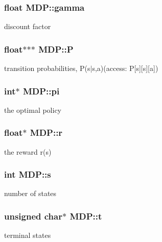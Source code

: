 \subsubsection[{\texorpdfstring{gamma}{gamma}}]{\setlength{\rightskip}{0pt plus 5cm}float M\+D\+P\+::gamma}\hypertarget{structMDP_a313e7a8dc1cb9a04af91936c9daf2c62}{}\label{structMDP_a313e7a8dc1cb9a04af91936c9daf2c62}
discount factor 
\subsubsection[{\texorpdfstring{P}{P}}]{\setlength{\rightskip}{0pt plus 5cm}float$\ast$$\ast$$\ast$ M\+D\+P\+::P}\hypertarget{structMDP_a395623fbc3e1cc9190c5acbfe4471462}{}\label{structMDP_a395623fbc3e1cc9190c5acbfe4471462}
transition probabilities, P(s\textquotesingle{}$\vert$s,a)(access\+: P\mbox{[}s\textquotesingle{}\mbox{]}\mbox{[}s\mbox{]}\mbox{[}a\mbox{]}) 
\subsubsection[{\texorpdfstring{pi}{pi}}]{\setlength{\rightskip}{0pt plus 5cm}int$\ast$ M\+D\+P\+::pi}\hypertarget{structMDP_aeba26ff8087d7dc83fda5bd779965928}{}\label{structMDP_aeba26ff8087d7dc83fda5bd779965928}
the optimal policy 
\subsubsection[{\texorpdfstring{r}{r}}]{\setlength{\rightskip}{0pt plus 5cm}float$\ast$ M\+D\+P\+::r}\hypertarget{structMDP_a8335e6f1093b7551784a41cc902ef9c8}{}\label{structMDP_a8335e6f1093b7551784a41cc902ef9c8}
the reward r(s) 
\subsubsection[{\texorpdfstring{s}{s}}]{\setlength{\rightskip}{0pt plus 5cm}int M\+D\+P\+::s}\hypertarget{structMDP_aa735fb802768fb82ff8e05eb9d99ef51}{}\label{structMDP_aa735fb802768fb82ff8e05eb9d99ef51}
number of states 
\subsubsection[{\texorpdfstring{t}{t}}]{\setlength{\rightskip}{0pt plus 5cm}unsigned char$\ast$ M\+D\+P\+::t}\hypertarget{structMDP_a70ae114113478796bd398bca88f32aa1}{}\label{structMDP_a70ae114113478796bd398bca88f32aa1}
terminal states 
